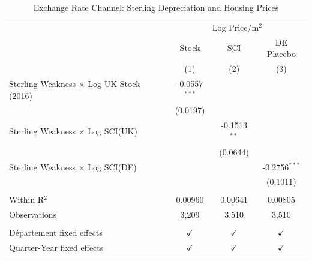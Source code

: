 
\begin{table}[htbp]
   \caption{\label{tab:exchange} Exchange Rate Channel: Sterling Depreciation and Housing Prices}
   \bigskip
   \centering
   \begin{tabular}{lccc}
      \toprule
       & \multicolumn{3}{c}{Log Price/m$^2$}\\
                                                      & Stock  & SCI  & DE Placebo \\    
                                                      & (1)                      & (2)                    & (3)\\  
      \midrule 
      Sterling Weakness $\times$ Log UK Stock (2016)  & -0.0557$^{***}$          &                        &   \\   
                                                      & (0.0197)                 &                        &   \\   
      Sterling Weakness $\times$ Log SCI(UK)          &                          & -0.1513$^{**}$         &   \\   
                                                      &                          & (0.0644)               &   \\   
      Sterling Weakness $\times$ Log SCI(DE)          &                          &                        & -0.2756$^{***}$\\   
                                                      &                          &                        & (0.1011)\\   
       \\
      Within R$^2$                                    & 0.00960                  & 0.00641                & 0.00805\\  
      Observations                                    & 3,209                    & 3,510                  & 3,510\\  
       \\
      D\'epartement fixed effects                     & $\checkmark$             & $\checkmark$           & $\checkmark$\\   
      Quarter-Year fixed effects                      & $\checkmark$             & $\checkmark$           & $\checkmark$\\   
      \bottomrule
   \end{tabular}
\end{table}


